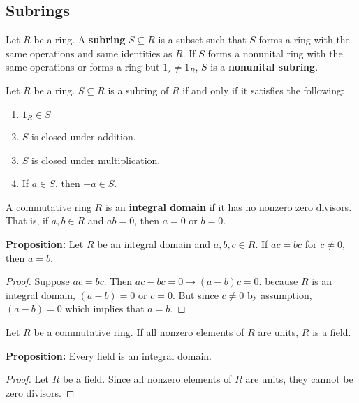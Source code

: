 \documentclass [12pt] {article}
\newenvironment{definition}[1]{\begin{tcolorbox}[title={Definition: #1},colback=blue!5!white,colframe=black!75!blue]}{\end{tcolorbox}}
\renewcommand{\bf}[1]{\textbf{{#1}}}
\begin{document}
\subsection{Subrings}
\begin{definition}{Subring}
    Let $R$ be a ring. A \bf{subring} $S \subseteq R$ is a subset such that $S$ forms a ring with
    the same operations and same identities as $R$. If $S$ forms a nonunital ring with the same
    operations or forms a ring but $1_s \neq 1_R$, $S$ is a \bf{nonunital subring}. \vspace{0.5em}

    Let $R$ be a ring. $S \subseteq R$ is a subring of $R$ if and only if it satisfies the following:
    \begin{enumerate}[label=(\arabic*)]
        \item $1_R \in S$
        \item $S$ is closed under addition.
        \item $S$ is closed under multiplication.
        \item If $a \in S$, then $-a \in S$.
    \end{enumerate}
\end{definition}

\begin{definition}{Integral Domain}
    A commutative ring $R$ is an \bf{integral domain} if it has no nonzero zero divisors. That is,
    if $a, b \in R$ and $ab = 0$, then $a = 0$ or $b = 0$.
\end{definition}
\bf{Proposition:} Let $R$ be an integral domain and $a, b, c \in R$. If $ac = bc$ for $c \neq 0$,
then $a = b$.
\begin{proof}
    Suppose $ac = bc$. Then $ac - bc = 0 \to (a - b) c = 0$. because $R$ is an integral domain,
    $(a - b) = 0$ or $c = 0$. But since $c \neq 0$ by assumption, $(a - b) = 0$ which implies that
    $a = b$.
\end{proof}

\begin{definition}{Field}
    Let $R$ be a commutative ring. If all nonzero elements of $R$ are units, $R$ is a field.
\end{definition}
\newpage
\bf{Proposition:} Every field is an integral domain.
\begin{proof}
    Let $R$ be a field. Since all nonzero elements of $R$ are units, they cannot be zero divisors.
\end{proof}
\end{document}
